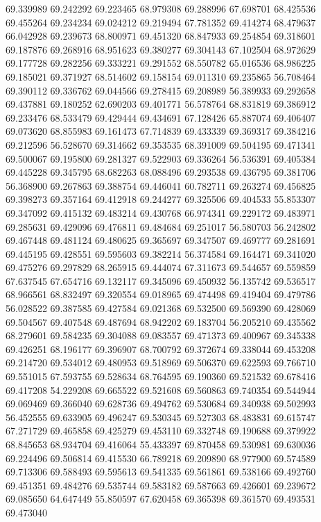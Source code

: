 69.339989
69.242292
69.223465
68.979308
69.288996
67.698701
68.425536
69.455264
69.234234
69.024212
69.219494
67.781352
69.414274
68.479637
66.042928
69.239673
68.800971
69.451320
68.847933
69.254854
69.318601
69.187876
69.268916
68.951623
69.380277
69.304143
67.102504
68.972629
69.177728
69.282256
69.333221
69.291552
68.550782
65.016536
68.986225
69.185021
69.371927
68.514602
69.158154
69.011310
69.235865
56.708464
69.390112
69.336762
69.044566
69.278415
69.208989
56.389933
69.292658
69.437881
69.180252
62.690203
69.401771
56.578764
68.831819
69.386912
69.233476
68.533479
69.429444
69.434691
67.128426
65.887074
69.406407
69.073620
68.855983
69.161473
67.714839
69.433339
69.369317
69.384216
69.212596
56.528670
69.314662
69.353535
68.391009
69.504195
69.471341
69.500067
69.195800
69.281327
69.522903
69.336264
56.536391
69.405384
69.445228
69.345795
68.682263
68.088496
69.293538
69.436795
69.381706
56.368900
69.267863
69.388754
69.446041
60.782711
69.263274
69.456825
69.398273
69.357164
69.412918
69.244277
69.325506
69.404533
55.853307
69.347092
69.415132
69.483214
69.430768
66.974341
69.229172
69.483971
69.285631
69.429096
69.476811
69.484684
69.251017
56.580703
56.242802
69.467448
69.481124
69.480625
69.365697
69.347507
69.469777
69.281691
69.445195
69.428551
69.595603
69.382214
56.374584
69.164471
69.341020
69.475276
69.297829
68.265915
69.444074
67.311673
69.544657
69.559859
67.637545
67.654716
69.132117
69.345096
69.450932
56.135742
69.536517
68.966561
68.832497
69.320554
69.018965
69.474498
69.419404
69.479786
56.028522
69.387585
69.427584
69.021368
69.532500
69.569390
69.428069
69.504567
69.407548
69.487694
68.942202
69.183704
56.205210
69.435562
68.279601
69.584235
69.304088
69.083557
69.471373
69.400967
69.345338
69.426251
68.196177
69.396907
68.700792
69.372674
69.338044
69.453208
69.214720
69.534012
69.480953
69.518969
69.506370
69.622593
69.766710
69.551015
67.593755
69.528634
68.764595
69.190360
69.521532
69.678416
69.417208
54.229208
69.665522
69.521608
69.560863
69.740354
69.544944
69.069469
69.366040
69.628736
69.494762
69.530684
69.340938
69.502993
56.452555
69.633905
69.496247
69.530345
69.527303
68.483831
69.615747
67.271729
69.465858
69.425279
69.453110
69.332748
69.190688
69.379922
68.845653
68.934704
69.416064
55.433397
69.870458
69.530981
69.630036
69.224496
69.506814
69.415530
66.789218
69.209890
68.977900
69.574589
69.713306
69.588493
69.595613
69.541335
69.561861
69.538166
69.492760
69.451351
69.484276
69.535744
69.583182
69.587663
69.426601
69.239672
69.085650
64.647449
55.850597
67.620458
69.365398
69.361570
69.493531
69.473040
